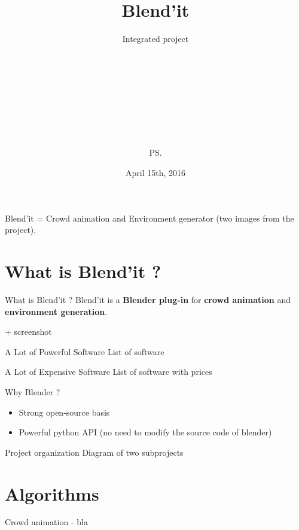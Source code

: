 \documentclass{beamer}
\title{Blend'it}
\subtitle{Integrated project}
\author{\bb\\ \gc\\ \dl\\ \vl\\ \om\\ \mr\\ \me\\ \js\\ \ps\\}
\date{April 15th, 2016}
\begin{document}
\maketitle

\begin{frame}
\tableofcontents[
  currentsection,
  sectionstyle=show/show,
  subsectionstyle=hide/hide]
\end{frame}




\bgroup
{}
\begin{frame}[plain]{}
\end{frame}
\egroup

\begin{frame}{}
  Blend'it = Crowd animation and Environment generator (two images from the project).
\end{frame}

\section{What is Blend'it ?}
\begin{frame}{What is Blend'it ?}
  Blend'it is a \textbf{Blender plug-in} for \textbf{crowd animation} and \textbf{environment generation}.
  
  + screenshot
\end{frame}

\begin{frame}{A Lot of Powerful Software}
  List of software
\end{frame}

\begin{frame}{A Lot of Expensive Software}
  List of software with prices
\end{frame}

\begin{frame}{Why Blender ?}
  \begin{itemize}
    \item Strong open-source basis
    \item Powerful python API (no need to modify the source code of blender)
  \end{itemize}
\end{frame}

\begin{frame}{Project organization}
  Diagram of two subprojects
\end{frame}

\section{Algorithms}
\begin{frame}{Crowd animation - }
  bla
\end{frame}
\end{document}
